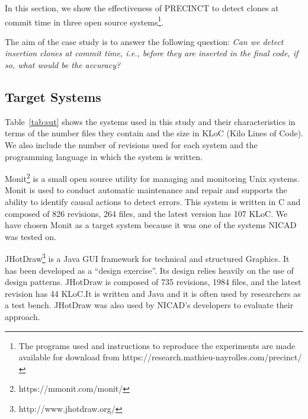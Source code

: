 \documentclass[conference]{IEEEtran}
\begin{document}
In this section, we show the effectiveness of PRECINCT to
detect clones at commit time in three open source systems\footnote{The programs used and instructions to reproduce the experiments are made available for download from https://research.mathieu-nayrolles.com/precinct/}.

The aim of the case study is to answer the following question: \textit{Can we detect insertion clones at commit time, i.e., before they are inserted in the final code, if so, what would be the accuracy?}

\subsection{Target Systems}
\label{sub:Target Systems}

Table~\ref{tab:sut} shows the systems used in this study and their characteristics in terms of the number files they contain and the size in KLoC (Kilo Lines of Code). We also include the number of revisions used for each system and the programming language in which the system is written.

\begin{table}[]
\centering
\caption{List of Target Systems in Terms of Files and Kilo Line of Code (KLOC) at current version and Language}
\label{tab:sut}
\end{table}

Monit\footnote{https://mmonit.com/monit/} is a small open source utility for managing and monitoring Unix systems.
Monit is used to conduct automatic maintenance and repair and supports the ability to identify causal actions to detect errors.
This system is written in C and composed of 826 revisions, 264 files, and the latest version has 107 KLoC.
We have chosen Monit as a target system because it was one of the systems NICAD was tested on.

JHotDraw\footnote{http://www.jhotdraw.org/} is a Java GUI framework for technical and structured Graphics.
It has been developed as a ``design exercise''. Its design relies heavily on the use of design patterns. JHotDraw is composed of 735 revisions, 1984 files, and the latest revision has 44 KLoC.It is written and Java and it is often used by researchers as a test bench. JHotDraw was also used by NICAD's developers to evaluate their approach.
\end{document}
